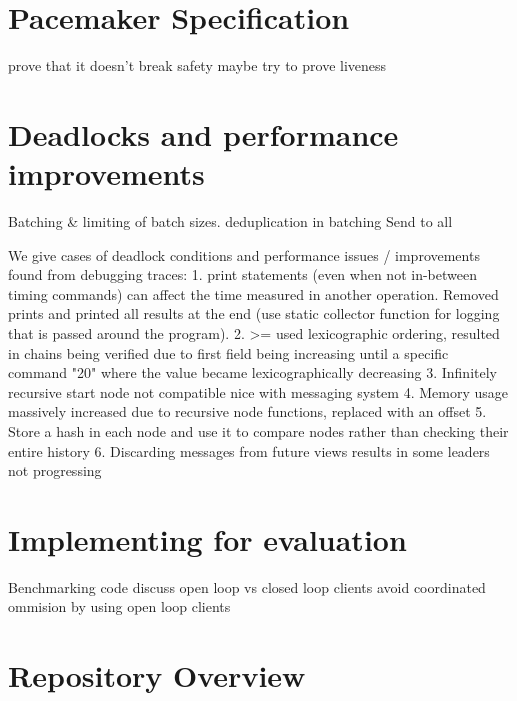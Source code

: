 \section{Pacemaker Specification}
prove that it doesn't break safety
maybe try to prove liveness
\section{Deadlocks and performance improvements}
Batching \& limiting of batch sizes. deduplication in batching
Send to all

We give cases of deadlock conditions
and performance issues / improvements found from debugging traces:
1. print statements (even when not in-between timing commands) can affect the time measured in another operation. Removed prints and printed all results at the end (use static collector function for logging that is passed around the program).
2. >= used lexicographic ordering, resulted in chains being verified due to first field being increasing until a specific command "20" where the value became lexicographically decreasing
3. Infinitely recursive start node not compatible nice with messaging system
4. Memory usage massively increased due to recursive node functions, replaced with an offset
5. Store a hash in each node and use it to compare nodes rather than checking their entire history
6. Discarding messages from future views results in some leaders not progressing
\section{Implementing for evaluation}
Benchmarking code
discuss open loop vs closed loop clients
avoid coordinated ommision by using open loop clients
\section{Repository Overview}